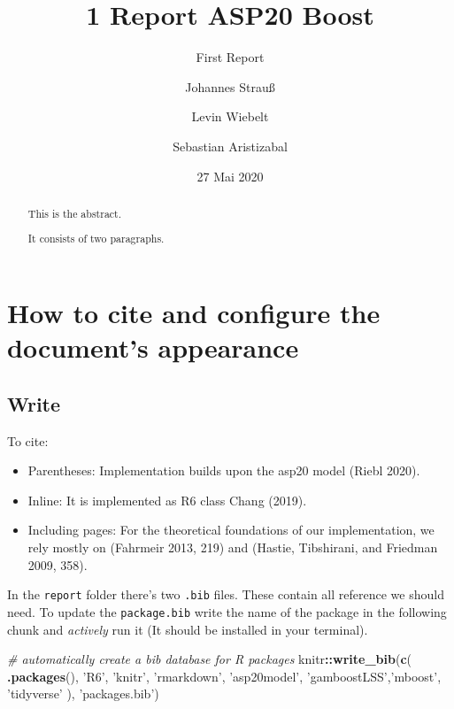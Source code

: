 \documentclass[
]{report}
\title{1 Report ASP20 Boost}
\subtitle{First Report}
\author{Johannes Strauß \and Levin Wiebelt \and Sebastian Aristizabal}
\date{27 Mai 2020}
\newenvironment{Shaded}{\begin{snugshade}}{\end{snugshade}}
\newcommand{\CommentTok}[1]{\textcolor[rgb]{0.56,0.35,0.01}{\textit{#1}}}
\newcommand{\KeywordTok}[1]{\textcolor[rgb]{0.13,0.29,0.53}{\textbf{#1}}}
\newcommand{\NormalTok}[1]{#1}
\newcommand{\OperatorTok}[1]{\textcolor[rgb]{0.81,0.36,0.00}{\textbf{#1}}}
\newcommand{\StringTok}[1]{\textcolor[rgb]{0.31,0.60,0.02}{#1}}
\providecommand{\tightlist}{%
  \setlength{\itemsep}{0pt}\setlength{\parskip}{0pt}}
\begin{document}
\maketitle
\begin{abstract}
This is the abstract.

It consists of two paragraphs.
\end{abstract}

{
\setcounter{tocdepth}{1}
\tableofcontents
}
\hypertarget{how-to-cite-and-configure-the-documents-appearance}{%
\chapter{How to cite and configure the document's
appearance}\label{how-to-cite-and-configure-the-documents-appearance}}

\hypertarget{write}{%
\section{Write}\label{write}}

To cite:

\begin{itemize}
\tightlist
\item
  Parentheses: Implementation builds upon the asp20 model (Riebl 2020).
\item
  Inline: It is implemented as R6 class Chang (2019).
\item
  Including pages: For the theoretical foundations of our
  implementation, we rely mostly on (Fahrmeir 2013, 219) and (Hastie,
  Tibshirani, and Friedman 2009, 358).
\end{itemize}

In the \texttt{report} folder there's two \texttt{.bib} files. These
contain all reference we should need. To update the \texttt{package.bib}
write the name of the package in the following chunk and \emph{actively}
run it (It should be installed in your terminal).

\begin{Shaded}
\begin{Highlighting}[]
\CommentTok{# automatically create a bib database for R packages}
\NormalTok{knitr}\OperatorTok{::}\KeywordTok{write_bib}\NormalTok{(}\KeywordTok{c}\NormalTok{(}
  \KeywordTok{.packages}\NormalTok{(), }\StringTok{'R6'}\NormalTok{, }\StringTok{'knitr'}\NormalTok{, }\StringTok{'rmarkdown'}\NormalTok{, }\StringTok{'asp20model'}\NormalTok{, }\StringTok{'gamboostLSS'}\NormalTok{,}\StringTok{'mboost'}\NormalTok{, }\StringTok{'tidyverse'}  
\NormalTok{), }\StringTok{'packages.bib'}\NormalTok{)}
\end{Highlighting}
\end{Shaded}
\end{document}

